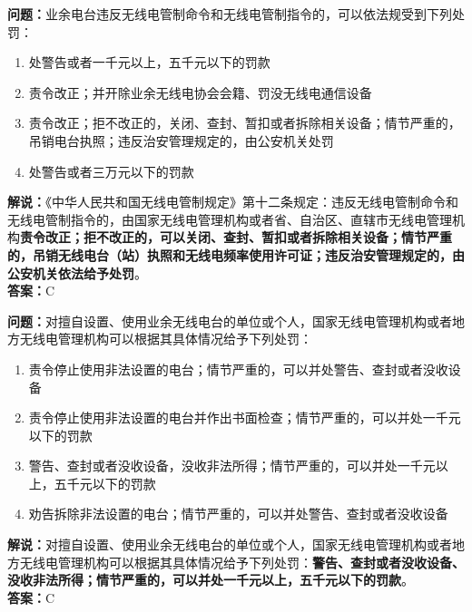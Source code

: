 \noindent\textbf{问题：}业余电台违反无线电管制命令和无线电管制指令的，可以依法规受到下列处罚：
\begin{enumerate}[label=\Alph*), leftmargin=3em]
	\item  处警告或者一千元以上，五千元以下的罚款
	\item  责令改正；并开除业余无线电协会会籍、罚没无线电通信设备
	\item  责令改正；拒不改正的，关闭、查封、暂扣或者拆除相关设备；情节严重的，吊销电台执照；违反治安管理规定的，由公安机关处罚
	\item  处警告或者三万元以下的罚款
\end{enumerate}
\noindent\textbf{解说：}《中华人民共和国无线电管制规定》第十二条规定：违反无线电管制命令和无线电管制指令的，由国家无线电管理机构或者省、自治区、直辖市无线电管理机构\textbf{责令改正；拒不改正的，可以关闭、查封、暂扣或者拆除相关设备；情节严重的，吊销无线电台（站）执照和无线电频率使用许可证；违反治安管理规定的，由公安机关依法给予处罚}。\\\noindent\textbf{答案：}C





\noindent\textbf{问题：}对擅自设置、使用业余无线电台的单位或个人，国家无线电管理机构或者地方无线电管理机构可以根据其具体情况给予下列处罚：
\begin{enumerate}[label=\Alph*), leftmargin=3em]
	\item  责令停止使用非法设置的电台；情节严重的，可以并处警告、查封或者没收设备
	\item  责令停止使用非法设置的电台并作出书面检查；情节严重的，可以并处一千元以下的罚款
	\item  警告、查封或者没收设备，没收非法所得；情节严重的，可以并处一千元以上，五千元以下的罚款
	\item  劝告拆除非法设置的电台；情节严重的，可以并处警告、查封或者没收设备
\end{enumerate}
\noindent\textbf{解说：}对擅自设置、使用业余无线电台的单位或个人，国家无线电管理机构或者地方无线电管理机构可以根据其具体情况给予下列处罚：\textbf{警告、查封或者没收设备、没收非法所得；情节严重的，可以并处一千元以上，五千元以下的罚款}。\\\textbf{答案：}C



\bigskip



